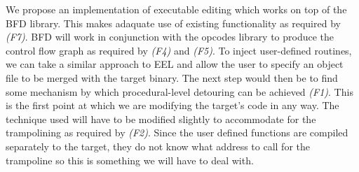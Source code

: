 We propose an implementation of executable editing which works on top of the BFD library. This makes adaquate use of existing functionality as required by \emph{(F7)}. BFD will work in conjunction with the opcodes library to produce the control flow graph as required by \emph{(F4)} and \emph{(F5)}. To inject user-defined routines, we can take a similar approach to EEL and allow the user to specify an object file to be merged with the target binary. The next step would then be to find some mechanism by which procedural-level detouring can be achieved \emph{(F1)}. This is the first point at which we are modifying the target's code in any way. The technique used will have to be modified slightly to accommodate for the trampolining as required by \emph{(F2)}. Since the user defined functions are compiled separately to the target, they do not know what address to call for the trampoline so this is something we will have to deal with.